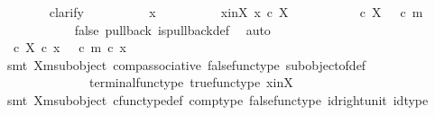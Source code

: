 \begin{isabellebody}
\ \ \ \ \ \ \isamarkupfalse%
\ clarify\isanewline
\ \ \ \ \ \ \ \ \isamarkupfalse%
\ x\isanewline
\ \ \ \ \ \ \ \ \isamarkupfalse%
\ x{\isacharunderscore}{\kern0pt}in{\isacharunderscore}{\kern0pt}X{\isacharcolon}{\kern0pt}\ {\isachardoublequoteopen}x\ {\isasymin}\isactrlsub c\ X{\isachardoublequoteclose}\isanewline
\ \ \ \ \ \ \ \ \isamarkupfalse%
\ {\isachardoublequoteopen}{\isasymt}\ {\isasymcirc}\isactrlsub c\ {\isasymbeta}\isactrlbsub X\isactrlesub \ {\isacharequal}{\kern0pt}\ {\isasymf}\ {\isasymcirc}\isactrlsub c\ m{\isachardoublequoteclose}\isanewline
\ \ \ \ \ \ \ \ \ \ \isamarkupfalse%
\ {\isasymchi}{\isacharunderscore}{\kern0pt}false\ {\isasymchi}{\isacharunderscore}{\kern0pt}pullback\ is{\isacharunderscore}{\kern0pt}pullback{\isacharunderscore}{\kern0pt}def\ \isamarkupfalse%
\ auto\isanewline
\ \ \ \ \ \ \ \ \isamarkupfalse%
\ \isamarkupfalse%
\ {\isachardoublequoteopen}{\isasymt}\ {\isasymcirc}\isactrlsub c\ {\isacharparenleft}{\kern0pt}{\isasymbeta}\isactrlbsub X\isactrlesub \ {\isasymcirc}\isactrlsub c\ x{\isacharparenright}{\kern0pt}\ {\isacharequal}{\kern0pt}\ {\isasymf}\ {\isasymcirc}\isactrlsub c\ {\isacharparenleft}{\kern0pt}m\ {\isasymcirc}\isactrlsub c\ x{\isacharparenright}{\kern0pt}{\isachardoublequoteclose}\isanewline
\ \ \ \ \ \ \ \ \ \ \isamarkupfalse%
\ {\isacharparenleft}{\kern0pt}smt\ X{\isacharunderscore}{\kern0pt}m{\isacharunderscore}{\kern0pt}subobject\ comp{\isacharunderscore}{\kern0pt}associative{}\ false{\isacharunderscore}{\kern0pt}func{\isacharunderscore}{\kern0pt}type\ subobject{\isacharunderscore}{\kern0pt}of{\isacharunderscore}{\kern0pt}def{}\isanewline
\ \ \ \ \ \ \ \ \ \ \ \ \ \ terminal{\isacharunderscore}{\kern0pt}func{\isacharunderscore}{\kern0pt}type\ true{\isacharunderscore}{\kern0pt}func{\isacharunderscore}{\kern0pt}type\ x{\isacharunderscore}{\kern0pt}in{\isacharunderscore}{\kern0pt}X{\isacharparenright}{\kern0pt}\isanewline
\ \ \ \ \ \ \ \ \isamarkupfalse%
\ \isamarkupfalse%
\ {\isachardoublequoteopen}{\isasymt}\ {\isacharequal}{\kern0pt}\ {\isasymf}{\isachardoublequoteclose}\isanewline
\ \ \ \ \ \ \ \ \ \ \isamarkupfalse%
\ {\isacharparenleft}{\kern0pt}smt\ X{\isacharunderscore}{\kern0pt}m{\isacharunderscore}{\kern0pt}subobject\ cfunc{\isacharunderscore}{\kern0pt}type{\isacharunderscore}{\kern0pt}def\ comp{\isacharunderscore}{\kern0pt}type\ false{\isacharunderscore}{\kern0pt}func{\isacharunderscore}{\kern0pt}type\ id{\isacharunderscore}{\kern0pt}right{\isacharunderscore}{\kern0pt}unit\ id{\isacharunderscore}{\kern0pt}type\isanewline

\end{isabellebody}
